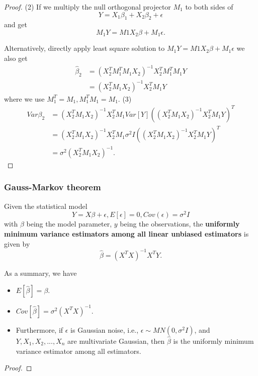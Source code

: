 \begin{refsection}
\begin{proof}
(2) If we multiply the null orthogonal projector $M_1$ to both sides of 
$$Y = X_1\beta_1 + X_2\beta_2 + \epsilon$$
and get
$$M_1Y = M1X_2 \beta + M_1\epsilon.$$

Alternatively, directly apply least square solution to $M_1Y = M1X_2 \beta + M_1\epsilon$ we also get
\begin{align*}
\hat{\beta}_2 &= (X_2^TM_1^TM_1X_2)^{-1}X_2^TM_1^TM_1Y \\
			  &= (X_2^TM_1X_2)^{-1}X_2^TM_1Y
\end{align*}
where we use $M_1^T = M_1, M^T_1M_1 = M_1.$
(3)
\begin{align*}
Var{\beta}_2 &= (X_2^TM_1X_2)^{-1}X_2^TM_1Var[Y] ((X_2^TM_1X_2)^{-1}X_2^TM_1Y)^T \\
			 &= (X_2^TM_1X_2)^{-1}X_2^TM_1\sigma^2 I ((X_2^TM_1X_2)^{-1}X_2^TM_1Y)^T \\
			 &= \sigma^2 (X_2^TM_1X_2)^{-1}.
\end{align*}
\end{proof}



\subsubsection{Gauss-Markov theorem}



\begin{theorem}\label{ch:regression-analysis:th:BestLinearUnbiasedEstimator}
	Given the statistical model
	$$Y= X\beta + \epsilon, E[\epsilon] = 0, Cov(\epsilon) = \sigma^2 I$$
	with $\beta$ being the model parameter, $y$ being the observations, the \textbf{uniformly minimum variance estimators among all linear unbiased estimators} is given by
	$$\hat{\beta} = (X^TX)^{-1}X^TY.$$
	
	As a summary, we have
	\begin{itemize}
		\item $E[\hat{\beta}] = \beta$.
		\item $Cov[\hat{\beta}] = \sigma^2(X^TX)^{-1}$.
		\item Furthermore, if $\epsilon$ is Gaussian noise, i.e., $\epsilon \sim MN(0, \sigma^2 I)$, and $Y,X_1,X_2,...,X_n$ are multivariate Gaussian, then $\hat{\beta}$ is the uniformly minimum variance estimator among all estimators.
	\end{itemize}
\end{theorem}
\begin{proof}
	

\end{proof}
\end{refsection}
